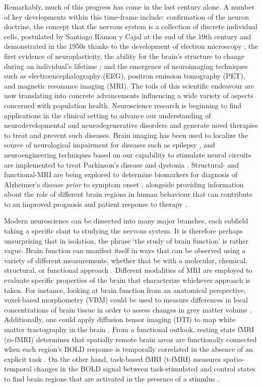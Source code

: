 Remarkably, much of this progress has come in the last century alone. A number of key developments within this time-frame include: confirmation of the neuron doctrine, the concept that the nervous system is a collection of discrete individual cells, postulated by Santiago Ramon y Cajal at the end of the 19th century and demonstrated in the 1950s thanks to the development of electron microscopy \citep{Lopez-Munoz2006-zk}; the first evidence of neuroplasticity, the ability for the brain's structure to change during an individual's lifetime \citep{Diamond1964-cu, Bennett1964-vx}; and the emergence of neuroimaging techniques such as electroencephalography (EEG), positron emission tomography (PET), and magnetic resonance imaging (MRI). The toils of this scientific endeavour are now translating into concrete advancements influencing a wide variety of aspects concerned with population health. Neuroscience research is beginning to find applications in the clinical setting to advance our understanding of neurodevelopmental and neurodegenerative disorders and generate novel therapies to treat and prevent such diseases. Brain imaging has been used to localize the source of neurological impairment for diseases such as epilepsy \citep{Stacey2008-qx}, and neuroengineering techniques based on our capability to stimulate neural circuits are implemented to treat Parkinson's disease \citep{Kalia2013-bv} and dystonia \citep{Fox2015-ds}. Structural- and functional-MRI are being explored to determine biomarkers for diagnosis of Alzheimer's disease \textit{prior} to symptom onset \citep{Sperling2014-sy, McEvoy2009-zx}, alongside providing information about the role of different brain regions in human behaviour that can contribute to an improved prognosis and patient response to therapy \citep{Matthews2006-sl}.  

Modern neuroscience can be dissected into many major branches, each subfield taking a specific slant to studying the nervous system. It is therefore perhaps unsurprising that in isolation, the phrase `the study of brain function' is rather vague. Brain function can manifest itself in ways that can be observed using a variety of different measurements, whether that be with a molecular, chemical, structural, or functional approach \citep{Hargreaves2012-dz}. Different modalities of MRI are employed to evaluate specific properties of the brain that characterize whichever approach is taken. For instance, looking at brain function from an anatomical perspective, voxel-based morphometry (VBM) could be used to measure differences in local concentrations of brain tissue in order to assess changes in grey matter volume \citep{Mechelli2005-dn}. Additionally, one could apply diffusion tensor imaging (DTI) to map white matter tractography in the brain \citep{Alexander2007-ut, Soares2013-mh}. From a functional outlook, resting state fMRI (rs-fMRI) determines that spatially remote brain areas are functionally connected when each region's BOLD response is temporally correlated in the absence of an explicit task \citep{Lee2013-kn}. On the other hand, task-based fMRI (t-fMRI) measures spatio-temporal changes in the BOLD signal between task-stimulated and control states to find brain regions that are activated in the presence of a stimulus \citep{Glover2011-at}. 

